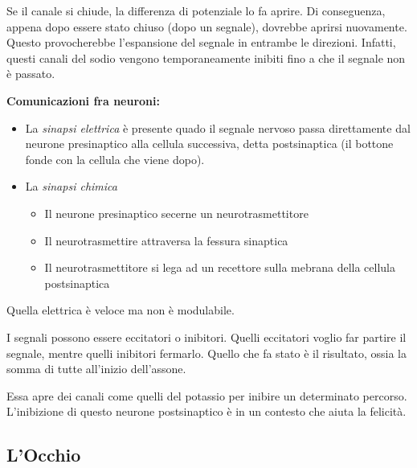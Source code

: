 \documentclass[a4paper]{article}
\begin{document}
Se il canale si chiude, la differenza di potenziale lo fa aprire.
Di conseguenza, appena dopo essere stato chiuso (dopo un segnale), dovrebbe aprirsi nuovamente.
Questo provocherebbe l'espansione del segnale in entrambe le direzioni.
Infatti, questi canali del sodio vengono temporaneamente inibiti fino a che il segnale non è passato.

\textbf{Comunicazioni fra neuroni:}

\begin{itemize}
    \item  La \textit{sinapsi elettrica} è presente quado il segnale nervoso passa direttamente dal
    neurone presinaptico alla cellula successiva, detta postsinaptica (il bottone fonde con la cellula che viene dopo).
    \item La \textit{sinapsi chimica}
    \begin{itemize}
        \item Il neurone presinaptico secerne un neurotrasmettitore
        \item Il neurotrasmettire attraversa la fessura sinaptica
        \item Il neurotrasmettitore si lega ad un recettore sulla mebrana della cellula postsinaptica
    \end{itemize}
\end{itemize}


Quella elettrica è veloce ma non è modulabile.

I segnali possono essere eccitatori o inibitori.
Quelli eccitatori voglio far partire il segnale, mentre quelli inibitori
fermarlo. Quello che fa stato è il risultato, ossia la somma di tutte
all'inizio dell'assone.

Essa apre dei canali come quelli del potassio per inibire un determinato percorso.
L'inibizione di questo neurone postsinaptico è in un contesto che aiuta la felicità.

\pagebreak

\subsection{L'Occhio}
\end{document}
